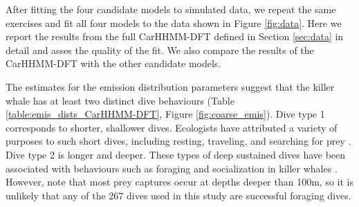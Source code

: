 



After fitting the four candidate models to simulated data, we repeat the same exercises and fit all four models to the data shown in Figure \ref{fig:data}. Here we report the results from the full CarHHMM-DFT defined in Section \ref{sec:data} in detail and asses the quality of the fit. We also compare the results of the CarHHMM-DFT with the other candidate models.

The estimates for the emission distribution parameters suggest that the killer whale has at least two distinct dive behaviours (Table \ref{table:emis_dists_CarHHMM-DFT}, Figure \ref{fig:coarse_emis}). 
Dive type 1 corresponds to shorter, shallower dives. Ecologists have attributed a variety of purposes to such short dives, including resting, traveling, and searching for prey \citep{Tennessen:2019a}.
Dive type 2 is longer and deeper. These types of deep sustained dives have been associated with behaviours such as foraging and socialization in killer whales \citep{Tennessen:2019a,Tennessen:2019b}. However, \citet{Wright:2017} note that most prey captures occur at depths deeper than 100m, so it is unlikely that any of the 267 dives used in this study are successful foraging dives.

